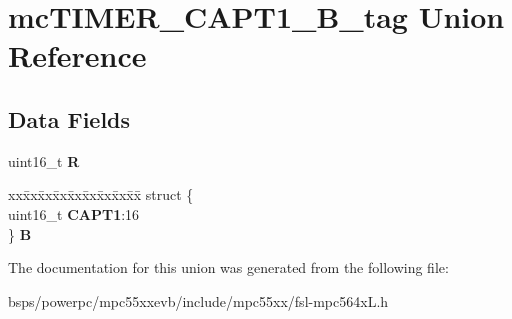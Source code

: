 \hypertarget{unionmcTIMER__CAPT1__16B__tag}{}\section{mc\+T\+I\+M\+E\+R\+\_\+\+C\+A\+P\+T1\+\_\+B\+\_\+tag Union Reference}
\label{unionmcTIMER__CAPT1__16B__tag}
\subsection*{Data Fields}
\begin{DoxyCompactItemize}
\item 
\mbox{\label{unionmcTIMER__CAPT1__16B__tag_a3426544d9c9eb9d002e2d14293e5dd49}} 
uint16\+\_\+t {\bfseries R}
\item 
\mbox{\label{unionmcTIMER__CAPT1__16B__tag_a0b27ef03168d6f3dac1f13599ebfd819}} 
\begin{tabbing}
xx\=xx\=xx\=xx\=xx\=xx\=xx\=xx\=xx\=\kill
struct \{\\
\>uint16\_t {\bfseries CAPT1}:16\\
\} {\bfseries B}\\

\end{tabbing}\end{DoxyCompactItemize}


The documentation for this union was generated from the following file\+:\begin{DoxyCompactItemize}
\item 
bsps/powerpc/mpc55xxevb/include/mpc55xx/fsl-\/mpc564x\+L.\+h\end{DoxyCompactItemize}
